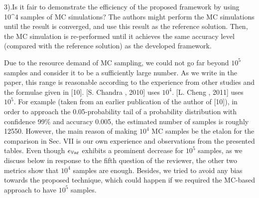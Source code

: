 \begin{reviewer}
3).Is it fair to demonstrate the efficiency of the proposed framework by using 10\^{}4 samples of MC simulations? The authors might perform the MC simulations until the result is converged, and use this result as the reference solution. Then, the MC simulation is re-performed until it achieves the same accuracy level (compared with the reference solution) as the developed framework.
\end{reviewer}
\begin{authors}
Due to the resource demand of MC sampling, we could not go far beyond $10^5$ samples and consider it to be a sufficiently large number.
As we write in the paper, this range is reasonable according to the experience from other studies and the formulae given in [10].
[S. Chandra \etal, 2010] uses $10^4$.
[L. Cheng \etal, 2011] uses $10^5$.
For example (taken from an earlier publication of the author of [10]), in order to approach the 0.05-probability tail of a probability distribution with confidence 99\% and accuracy 0.005, the estimated number of samples is roughly 12550.
However, the main reason of making $10^4$ MC samples be the etalon for the comparison in Sec. VII is our own experience and observations from the presented tables.
Even though $\epsilon_{\mathbb{V}\text{ar}}$ exhibits a prominent decrease for $10^5$ samples, as we discuss below in response to the fifth question of the reviewer, the other two metrics show that $10^4$ samples are enough.
Besides, we tried to avoid any bias towards the proposed technique, which could happen if we required the MC-based approach to have $10^5$ samples.
\end{authors}

